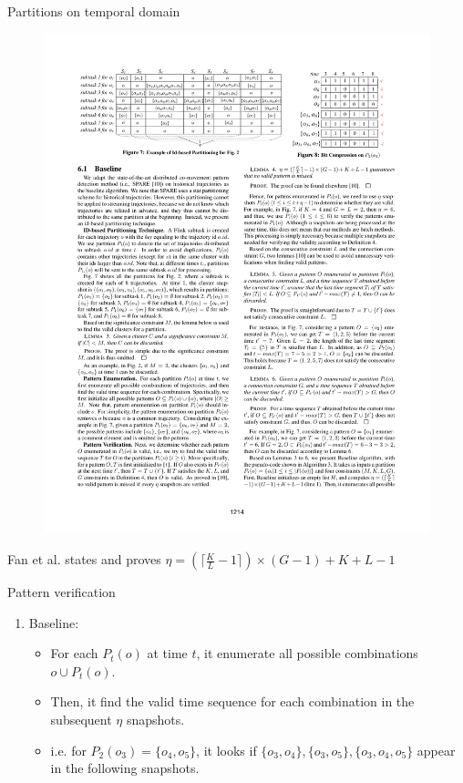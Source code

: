 \documentclass{beamer}
\begin{document}
\begin{frame}{Partitions on temporal domain}
    \centering 
    \begin{figure}
        \includegraphics[trim=2cm 21cm 8cm 2cm, clip, width=1\textwidth]{figures/Chen_p1214}
    \end{figure}
    Fan et al. states and proves $\eta = (\lceil \frac{K}{L} - 1 \rceil) \times (G - 1) + K + L - 1$
\end{frame}

\begin{frame}{Pattern verification}
    \begin{enumerate}
        \item Baseline:
        \begin{itemize}
            \item For each $P_t(o)$ at time $t$, it enumerate all possible combinations ${o} \cup P_t(o)$.
            \item Then, it find the valid time sequence for each combination in the subsequent $\eta$ snapshots.
            \item i.e. for $P_2(o_3)= \{o_4,o_5\}$, it looks if $\{o_3,o_4\},\{o_3,o_5\},\{o_3,o_4,o_5\}$ appear in the following snapshots.
        \end{itemize}
    \end{enumerate}
\end{frame}
\end{document}
